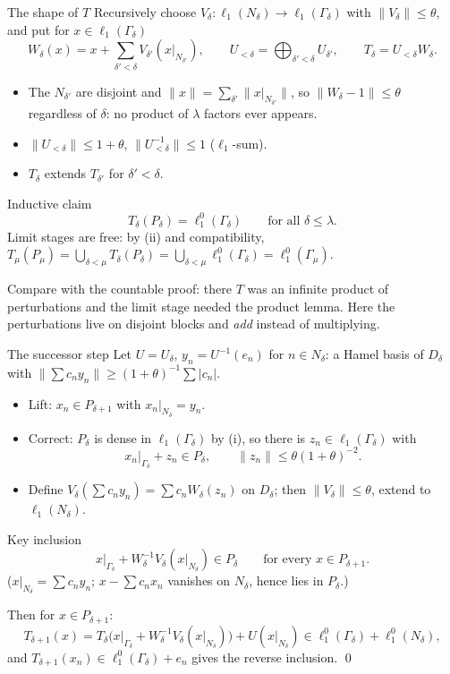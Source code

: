\documentclass[10pt,aspectratio=169]{beamer}
\newcommand{\lo}[1]{\ell_1^0(#1)}
\newcommand{\ellone}[1]{\ell_1(#1)}
\begin{document}
\begin{frame}{The shape of $T$}
  Recursively choose $V_\delta\colon\ellone{N_\delta}\to\ellone{\Gamma_\delta}$ with
  $\|V_\delta\|\le\theta$, and put for $x\in\ellone{\Gamma_\delta}$
  \[
    W_\delta(x)=x+\sum_{\delta'<\delta}V_{\delta'}(x|_{N_{\delta'}}),\qquad
    U_{<\delta}=\bigoplus_{\delta'<\delta}U_{\delta'},\qquad
    T_\delta=U_{<\delta}W_\delta .
  \]
  \begin{itemize}
    \item The $N_{\delta'}$ are disjoint and $\|x\|=\sum_{\delta'}\|x|_{N_{\delta'}}\|$, so
      \alert{$\|W_\delta-1\|\le\theta$ regardless of $\delta$}: no product of
      $\lambda$ factors ever appears.
    \item $\|U_{<\delta}\|\le1+\theta$, $\|U_{<\delta}^{-1}\|\le1$ ($\ell_1$-sum).
    \item $T_\delta$ extends $T_{\delta'}$ for $\delta'<\delta$.
  \end{itemize}
  \begin{block}{Inductive claim}
    \[
      T_\delta(P_\delta)=\lo{\Gamma_\delta}\qquad\text{for all }\delta\le\lambda .
    \]
    Limit stages are free: by (ii) and compatibility,
    $T_\mu(P_\mu)=\bigcup_{\delta<\mu}T_\delta(P_\delta)=\bigcup_{\delta<\mu}\lo{\Gamma_\delta}=\lo{\Gamma_\mu}$.
  \end{block}
  Compare with the countable proof: there $T$ was an infinite product of
  perturbations and the limit stage needed the product lemma. Here the
  perturbations live on disjoint blocks and \emph{add} instead of multiplying.
\end{frame}

\begin{frame}{The successor step}
  Let $U=U_\delta$, $y_n=U^{-1}(e_n)$ for $n\in N_\delta$: a Hamel basis of $D_\delta$ with
  $\|\sum c_ny_n\|\ge{(1+\theta)}^{-1}\sum|c_n|$.
  \begin{itemize}
    \item Lift: $x_n\in P_{\delta+1}$ with $x_n|_{N_\delta}=y_n$.
    \item Correct: $P_\delta$ is dense in $\ellone{\Gamma_\delta}$ by (i), so there is
      $z_n\in\ellone{\Gamma_\delta}$ with
      \[
        x_n|_{\Gamma_\delta}+z_n\in P_\delta,\qquad\|z_n\|\le\theta{(1+\theta)}^{-2}.
      \]
    \item Define $V_\delta(\sum c_ny_n)=\sum c_nW_\delta(z_n)$ on $D_\delta$; then
      $\|V_\delta\|\le\theta$, extend to $\ellone{N_\delta}$.
  \end{itemize}
  \begin{block}{Key inclusion}
    \[
      x|_{\Gamma_\delta}+W_\delta^{-1}V_\delta(x|_{N_\delta})\in P_\delta
      \qquad\text{for every }x\in P_{\delta+1}.
    \]
    ($x|_{N_\delta}=\sum c_ny_n$; $x-\sum c_nx_n$ vanishes on $N_\delta$, hence lies in $P_\delta$.)
  \end{block}
  Then for $x\in P_{\delta+1}$:
  \[
    T_{\delta+1}(x)=T_\delta\bigl(x|_{\Gamma_\delta}+W_\delta^{-1}V_\delta(x|_{N_\delta})\bigr)+U(x|_{N_\delta})
    \in\lo{\Gamma_\delta}+\lo{N_\delta},
  \]
  and $T_{\delta+1}(x_n)\in\lo{\Gamma_\delta}+e_n$ gives the reverse inclusion. \qed
\end{frame}
\end{document}
